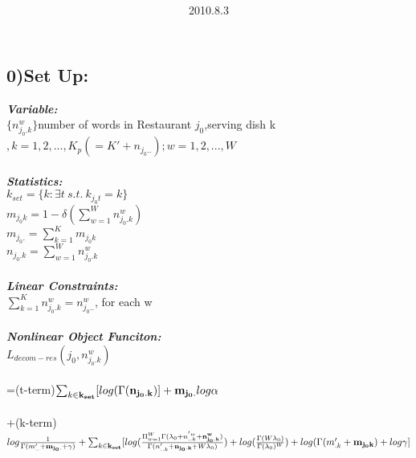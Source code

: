 \documentclass{article}
\title{\vspace{0.3in}\textmd{\textbf{\hmwkTitle}}}
\date{2010.8.3}
\author{\textbf{\hmwkAuthorName}}
\begin{document}
\begin{spacing}{1.1}
\maketitle

\section{0)Set Up:}
{\bf \emph{Variable:}}\\
$\{n_{j_{0}.k}^{w}\}$number of words in Restaurant $j_{0}$,serving dish k$,k=1,2,...,K_{p}(=K'+n_{j_{0}..});w=1,2,...,W$\\ \\
{\bf \emph{Statistics:}}\\
$k_{set}=\{k:\exists t \ s.t.\ k_{j_{0}t}=k\}$\\
$m_{j_{0}k}=1-\delta(\sum_{w=1}^{W} n_{j_{0}.k}^{w})$\\
$m_{j_{0}.}=\sum_{k=1}^{K} m_{j_{0}k}$\\
$n_{j_{0}.k}=\sum_{w=1}^{W} n_{j_{0}.k}^{w}$\\ \\
{\bf \emph{Linear Constraints:}}\\
$\sum_{k=1}^{K} n_{j_{0}.k}^{w}=n_{j_{0}..}^{w}$, for each w\\\\
{\bf \emph{Nonlinear Object Funciton:}}\\
$L_{decom-res}(j_{0},n_{j_{0}.k}^{w})$\\\\
=(t-term)$ \sum_{k\in {\bf k_{set}}}[log(\Gamma({\bf n_{j_{0}.k}})]+{\bf m_{j_{0}.}}log \alpha$\\ \\
+(k-term)$ log \frac{1}{\Gamma(m_{..}'+{\bf m_{j_{0}.}}+\gamma)}+\sum_{k\in {\bf k_{set}}}[log(\frac{\Pi_{w=1}^{W}\Gamma(\lambda_{0}+n_{..k}^{'w}+{\bf n_{j_{0}.k}^{w}})}{\Gamma(n_{..k}'+{\bf{n_{j_{0}.k}}}+W\lambda_{0})})+log(\frac{\Gamma(W\lambda_{0})}{\Gamma(\lambda_{0})^{W}})
+log(\Gamma(m_{.k}'+{\bf m_{j_{0}k}})+log \gamma]$\\ 


\end{spacing}
\end{document}

